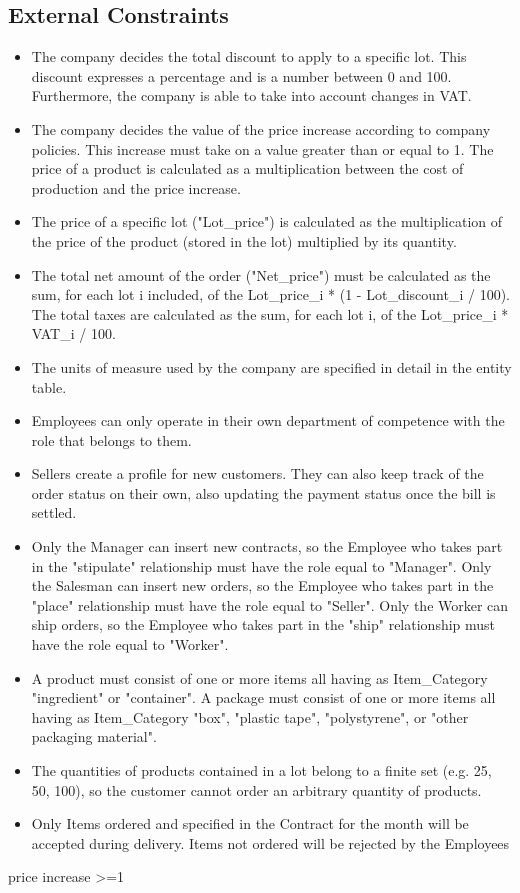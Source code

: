 \subsection{External Constraints}
\begin{itemize}
\item The company decides the total discount to apply to a specific lot. This discount expresses a percentage and is a number between 0 and 100. Furthermore, the company is able to take into account changes in VAT.
\item The company decides the value of the price increase according to company policies. This increase must take on a value greater than or equal to 1. The price of a product is calculated as a multiplication between the cost of production and the price increase.
\item The price of a specific lot ("Lot\_price") is calculated as the multiplication of the price of the product (stored in the lot) multiplied by its quantity.
\item The total net amount of the order ("Net\_price") must be calculated as the sum, for each lot i included, of the Lot\_price\_i * (1 - Lot\_discount\_i / 100). The total taxes are calculated as the sum, for each lot i, of the Lot\_price\_i * VAT\_i / 100.
\item The units of measure used by the company are specified in detail in the entity table.
\item Employees can only operate in their own department of competence with the role that belongs to them.
\item Sellers create a profile for new customers. They can also keep track of the order status on their own, also updating the payment status once the bill is settled.
\item Only the Manager can insert new contracts, so the Employee who takes part in the "stipulate" relationship must have the role equal to "Manager". Only the Salesman can insert new orders, so the Employee who takes part in the "place" relationship must have the role equal to "Seller". Only the Worker can ship orders, so the Employee who takes part in the "ship" relationship must have the role equal to "Worker".
\item A product must consist of one or more items all having as Item\_Category "ingredient" or "container". A package must consist of one or more items all having as Item\_Category "box", "plastic tape", "polystyrene", or "other packaging material". %
\item The quantities of products contained in a lot belong to a finite set (e.g. 25, 50, 100), so the customer cannot order an arbitrary quantity of products.
\item Only Items ordered and specified in the Contract for the month will be accepted during delivery. Items not ordered will be rejected by the Employees
\end{itemize}

price increase >=1